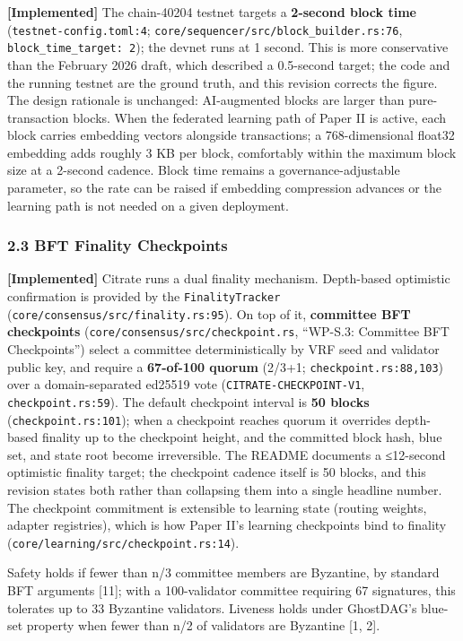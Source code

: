 \textbf{{[}Implemented{]}} The chain-40204 testnet targets a
\textbf{2-second block time} (\texttt{testnet-config.toml:4};
\texttt{core/sequencer/src/block\_builder.rs:76},
\texttt{block\_time\_target:\ 2}); the devnet runs at 1 second. This is
more conservative than the February 2026 draft, which described a
0.5-second target; the code and the running testnet are the ground
truth, and this revision corrects the figure. The design rationale is
unchanged: AI-augmented blocks are larger than pure-transaction blocks.
When the federated learning path of Paper II is active, each block
carries embedding vectors alongside transactions; a 768-dimensional
float32 embedding adds roughly 3 KB per block, comfortably within the
maximum block size at a 2-second cadence. Block time remains a
governance-adjustable parameter, so the rate can be raised if embedding
compression advances or the learning path is not needed on a given
deployment.

\subsubsection{2.3 BFT Finality
Checkpoints}\label{bft-finality-checkpoints}

\textbf{{[}Implemented{]}} Citrate runs a dual finality mechanism.
Depth-based optimistic confirmation is provided by the
\texttt{FinalityTracker} (\texttt{core/consensus/src/finality.rs:95}).
On top of it, \textbf{committee BFT checkpoints}
(\texttt{core/consensus/src/checkpoint.rs}, ``WP-S.3: Committee BFT
Checkpoints'') select a committee deterministically by VRF seed and
validator public key, and require a \textbf{67-of-100 quorum} (2/3+1;
\texttt{checkpoint.rs:88,103}) over a domain-separated ed25519 vote
(\texttt{CITRATE-CHECKPOINT-V1}, \texttt{checkpoint.rs:59}). The default
checkpoint interval is \textbf{50 blocks} (\texttt{checkpoint.rs:101});
when a checkpoint reaches quorum it overrides depth-based finality up to
the checkpoint height, and the committed block hash, blue set, and state
root become irreversible. The README documents a ≤12-second optimistic
finality target; the checkpoint cadence itself is 50 blocks, and this
revision states both rather than collapsing them into a single headline
number. The checkpoint commitment is extensible to learning state
(routing weights, adapter registries), which is how Paper II's learning
checkpoints bind to finality
(\texttt{core/learning/src/checkpoint.rs:14}).

Safety holds if fewer than n/3 committee members are Byzantine, by
standard BFT arguments {[}11{]}; with a 100-validator committee
requiring 67 signatures, this tolerates up to 33 Byzantine validators.
Liveness holds under GhostDAG's blue-set property when fewer than n/2 of
validators are Byzantine {[}1, 2{]}.

